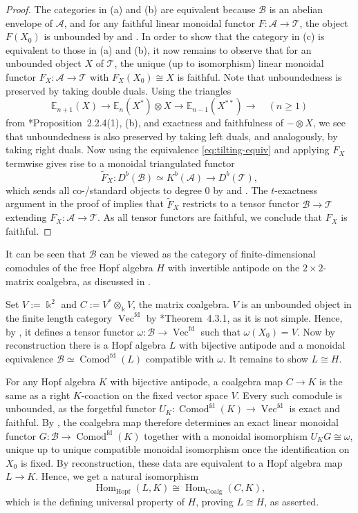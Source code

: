 \documentclass[11pt,oneside]{amsart}
\theoremstyle{definition}
\theoremstyle{remark}
\newcommand\kk{\Bbbk}
\newcommand\EE{\mathbb E}
\newcommand\cA{\mathcal A}
\newcommand\cB{\mathcal B}
\newcommand\cT{\mathcal T}
\newcommand\Vect{\operatorname{Vec}}
\newcommand\Comod{\operatorname{Comod}}
\newcommand\Hom{\operatorname{Hom}}
\renewcommand\o\otimes
\renewcommand\:\colon
\newcommand\fd{^{\mathrm{fd}}}
\begin{document}
\begin{proof}
The categories in (a) and (b) are equivalent because $\cB$ is an abelian envelope of $\cA$, and for any faithful linear monoidal functor $F\: \cA \to \cT$, the object $F(X_0)$ is unbounded by  and .
In order to show that the category in (c) is equivalent to those in (a) and (b), it now remains to observe that for an unbounded object $X$ of $\cT$, the unique (up to isomorphism) linear monoidal functor $F_X\:\cA\to\cT$ with $F_X(X_0) \cong X$ is faithful.
Note that unboundedness is preserved by taking double duals.
Using the triangles
$$
\EE_{n+1}(X)\to\EE_n(X^*)\o X\to\EE_{n-1}(X^{**})\to
\quad(n\ge1)
$$
from \cite{CE}*{Proposition~2.2.4(1)}, (b), and exactness and faithfulness of $-\o X$, we see that unboundedness is also preserved by taking left duals, and analogously, by taking right duals.
Now using the equivalence \eqref{eq:tilting-equiv} and applying $F_X$ termwise gives rise to a monoidal triangulated functor
\[ \tilde F_X \colon D^b(\cB) \simeq K^b(\cA) \longrightarrow D^b(\cT) , \]
which sends all co-/standard objects to degree $0$ by  and .
The $t$-exactness argument in the proof of  implies that $\tilde F_X$ restricts to a tensor functor $\cB \to \cT$ extending $F_X \colon \cA \to \cT$.
As all tensor functors are faithful, we conclude that $F_X$ is faithful.
\end{proof}

\begin{remark} It can be seen that $\cB$ can be viewed as the category of finite-dimensional comodules of the free Hopf algebra $H$ with invertible antipode on the $2\times2$-matrix coalgebra, as discussed in \cites{Sch,Ch,RVdB}. 

Set $V:=\kk^2$ and $C:=V^*\o_\kk V$, the matrix coalgebra. $V$ is an unbounded object in the finite length category $\Vect\fd$ by \cite{CE}*{Theorem~4.3.1}, as it is not simple. Hence, by , it defines a tensor functor $\omega\:\cB\to\Vect\fd$ such that $\omega(X_0)=V$. Now by reconstruction there is a Hopf algebra $L$ with bijective antipode and a monoidal equivalence $\cB\simeq\Comod\fd(L)$ compatible with $\omega$. It remains to show $L\cong H$.

For any Hopf algebra $K$ with bijective antipode, a coalgebra map $C\to K$ is the same as a right $K$-coaction on the fixed vector space $V$. Every such comodule is unbounded, as the forgetful functor $U_K\:\Comod\fd(K)\to\Vect\fd$ is exact and faithful. By , the coalgebra map therefore determines an exact linear monoidal functor $G\:\cB\to\Comod\fd(K)$ together with a monoidal isomorphism $U_KG\cong\omega$, unique up to unique compatible monoidal isomorphism once the identification on $X_0$ is fixed. By reconstruction, these data are equivalent to a Hopf algebra map $L\to K$. Hence, we get a natural isomorphism
$$
\Hom_{\mathrm{Hopf}}(L,K)
\cong \Hom_{\mathrm{Coalg}}(C,K),
$$
which is the defining universal property of $H$, proving $L\cong H$, as asserted.
\end{remark}



{}

\end{document}

